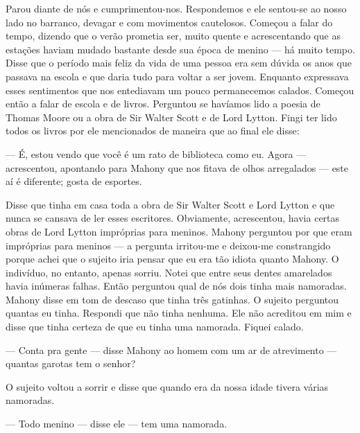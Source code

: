Parou diante de nós e cumprimentou-nos. Respondemos e ele sentou-se ao
nosso lado no barranco, devagar e com movimentos cautelosos. Começou a
falar do tempo, dizendo que o verão prometia ser, muito quente e
acrescentando que as estações haviam mudado bastante desde sua época
de menino --- há muito tempo. Disse que o período mais feliz da vida
de uma pessoa era sem dúvida os anos que passava na escola e que daria
tudo para voltar a ser jovem. Enquanto expressava esses sentimentos
que nos entediavam um pouco permanecemos calados. Começou então a
falar de escola e de livros. Perguntou se havíamos lido a poesia de
Thomas Moore ou a obra de Sir Walter Scott e de Lord Lytton. Fingi
ter lido todos os livros por ele mencionados de maneira que ao final
ele disse:

--- É, estou vendo que você é um rato de biblioteca como eu. Agora ---
acrescentou, apontando para Mahony que nos fitava de olhos arregalados
--- este aí é diferente; gosta de esportes.

Disse que tinha em casa toda a obra de Sir Walter Scott e Lord Lytton
e que nunca se cansava de ler esses escritores. Obviamente,
acrescentou, havia certas obras de Lord Lytton impróprias para
meninos. Mahony perguntou por que eram impróprias para meninos ---
a pergunta irritou-me e deixou-me constrangido porque achei que o
sujeito iria pensar que eu era tão idiota quanto Mahony. O indivíduo,
no entanto, apenas sorriu. Notei que entre seus dentes amarelados
havia inúmeras falhas. Então perguntou qual de nós dois tinha mais
namoradas. Mahony disse em tom de descaso que tinha três gatinhas. O
sujeito perguntou quantas eu tinha. Respondi que não tinha nenhuma.
Ele não acreditou em mim e disse que tinha certeza de que eu tinha uma
namorada. Fiquei calado.

--- Conta pra gente --- disse Mahony ao homem com um ar de atrevimento
---  quantas garotas tem o senhor?

O sujeito voltou a sorrir e disse que quando era da nossa idade tivera
várias namoradas.

--- Todo menino --- disse ele --- tem uma namorada.

